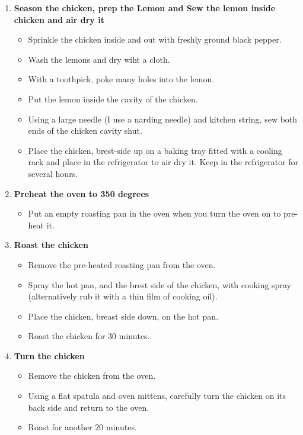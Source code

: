 \documentclass[11pt,letterpaper]{article}
\begin{document}
\begin {description}
\begin{enumerate}
\item {\bf Season the chicken, prep the Lemon and Sew the lemon inside chicken and air dry it}
\begin{itemize}
\item Sprinkle the chicken inside and out with freshly ground black pepper.
\item Wash the lemons and dry wiht a cloth.
\item With a toothpick, poke many holes into the lemon.
\item Put the lemon inside the cavity of the chicken.
\item Using a large needle (I use a narding needle) and kitchen string, sew both ends of the chicken cavity shut.
\item Place the chicken, brest-side up on a baking tray fitted with a cooling rack and place in the refrigerator to air dry it. Keep in the refrigerator for several hours.
\end{itemize}

\item{\bf Preheat the oven to 350 degrees}
\begin{itemize}
\item Put an empty roasting pan in the oven when you turn the oven on to pre-heat it. 
\end{itemize}

\item{\bf Roast the chicken}
\begin{itemize}
\item Remove the pre-heated roasting pan from the oven. 
\item Spray the hot pan, and the brest side of the chicken, with cooking spray (alternatively rub it with a thin film of cooking oil).
\item Place the chicken, breast side down, on the hot pan.
\item Roast the chicken for 30 minutes.
\end{itemize}

\item{\bf Turn the chicken}
\begin{itemize}
\item Remove the chicken from the oven.
\item Using a flat spatula and oven mittens, carefully turn the chicken on its back side and return to the oven.
\item Roast for another 20 minutes.
\end{itemize}


\end{enumerate}
\end{description}
\end{document}
